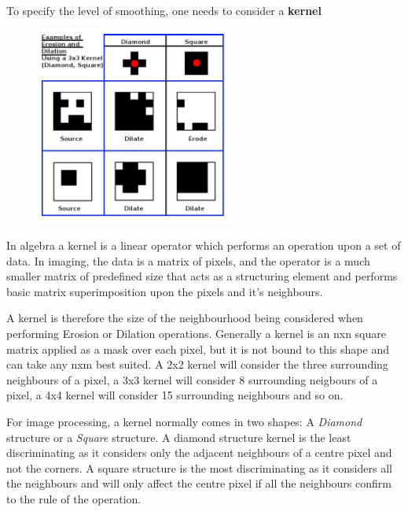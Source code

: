 {{To specify the level of smoothing, one needs to consider a {\bf kernel}

\begin{figure}
	\vspace{-10pt}
	\centering
	\includegraphics[width=0.58\textwidth]{../images/kernel}
	\vspace{-20pt}
	\caption{}\label{img:kernel}
	\vspace{-30pt}
\end{figure}

In algebra a kernel is a linear operator which performs an operation upon a set of data. In imaging, the data is a matrix of pixels, and the operator is a much smaller matrix of predefined size that acts as a structuring element and performs basic matrix superimposition upon the pixels and it's neighbours.

A kernel is therefore the size of the neighbourhood being considered when performing Erosion or Dilation operations. Generally a kernel is an nxn square matrix applied as a mask over each pixel, but it is not bound to this shape and can take any nxm best suited.
A 2x2 kernel will consider the three surrounding neighbours of a pixel, a 3x3 kernel will consider 8 surrounding neigbours of a pixel, a 4x4 kernel will consider 15 surrounding neighbours and so on.

For  image processing, a kernel normally comes in two shapes: A {\it Diamond} structure or a {\it Square} structure. A diamond structure kernel is the least discriminating as it considers only the adjacent neighbours of a centre pixel and not the corners. A square structure  is the most discriminating as it considers all the neighbours and will only affect the centre pixel if all the neighbours confirm to the rule of the operation.

}}
